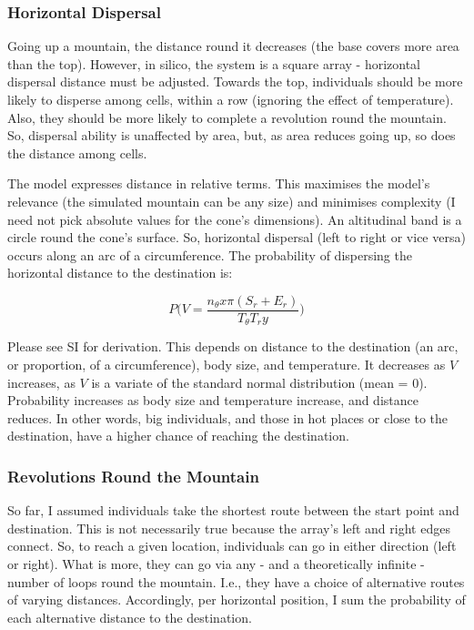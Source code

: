 \documentclass[11pt]{article}
\begin{document}
\subsubsection*{Horizontal Dispersal}
Going up a mountain, the distance round it decreases (the base covers more area than the top). However, in silico, the system is a square array - horizontal dispersal distance must be adjusted. Towards the top, individuals should be more likely to disperse among cells, within a row (ignoring the effect of temperature). Also, they should be more likely to complete a revolution round the mountain. So, dispersal ability is unaffected by area, but, as area reduces going up, so does the distance among cells.

The model expresses distance in relative terms. This maximises the model's relevance (the simulated mountain can be any size) and minimises complexity (I need not pick absolute values for the cone's dimensions). An altitudinal band is a circle round the cone's surface. So, horizontal dispersal (left to right or vice versa) occurs along an arc of a circumference. The probability of dispersing the horizontal distance to the destination is:

$$P\Big(V = \frac{n_\theta x \pi (S_r + E_r)}{T_\theta T_r y}\Big)$$

Please see SI for derivation. This depends on distance to the destination (an arc, or proportion, of a circumference), body size, and temperature. It decreases as $V$ increases, as $V$ is a variate of the standard normal distribution (mean = 0). Probability increases as body size and temperature increase, and distance reduces. In other words, big individuals, and those in hot places or close to the destination, have a higher chance of reaching the destination.

\subsubsection*{Revolutions Round the Mountain}
So far, I assumed individuals take the shortest route between the start point and destination. This is not necessarily true because the array's left and right edges connect. So, to reach a given location, individuals can go in either direction (left or right). What is more, they can go via any - and a theoretically infinite - number of loops round the mountain.
I.e., they have a choice of alternative routes of varying distances. Accordingly, per horizontal position, I sum the probability of each alternative distance to the destination.
\end{document}
